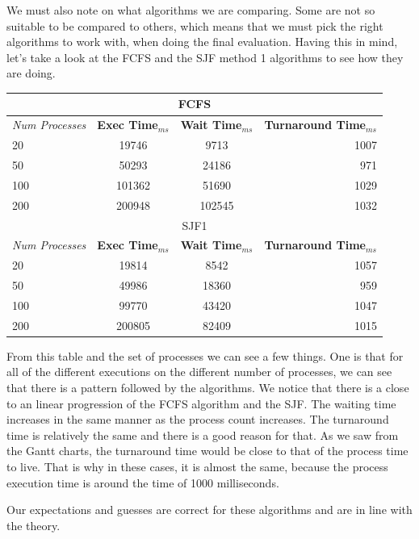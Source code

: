 \documentclass{article}
\begin{document}
We must also note on what algorithms we are comparing. Some are not so suitable to be compared to others, which means that we must pick the right algorithms to work with, when doing the final evaluation. Having this in mind, let's take a look at the FCFS and the SJF method 1 algorithms to see how they are doing.

\begin{center}
  \begin{tabular}{l|c|c|r}
    \multicolumn{4}{c}{FCFS} \\
    \toprule
    \textit{Num Processes} & \textbf{Exec Time}$_{ms}$ & \textbf{Wait Time}$_{ms}$ & \textbf{Turnaround Time}$_{ms}$ \\
    \midrule
    20 & 19746 & 9713 & 1007 \\ \hline
    50 & 50293 & 24186 & 971 \\ \hline
    100 & 101362 & 51690 & 1029 \\ \hline
    200 & 200948 & 102545 & 1032 \\
    \bottomrule
    \toprule
    \multicolumn{4}{c}{SJF1} \\
    \toprule
    \textit{Num Processes} & \textbf{Exec Time}$_{ms}$ & \textbf{Wait Time}$_{ms}$ & \textbf{Turnaround Time}$_{ms}$ \\
    \midrule
    20 & 19814 & 8542 & 1057 \\ \hline
    50 & 49986 & 18360 & 959 \\ \hline
    100 & 99770 & 43420 & 1047 \\ \hline
    200 & 200805 & 82409 & 1015 \\
    \bottomrule
    \toprule
  \end{tabular}
\end{center}

From this table and the set of processes we can see a few things. One is that for all of the different executions on the different number of processes, we can see that there is a pattern followed by the algorithms. We notice that there is a close to an linear progression of the FCFS algorithm and the SJF. The waiting time increases in the same manner as the process count increases. The turnaround time is relatively the same and there is a good reason for that. As we saw from the Gantt charts, the turnaround time would be close to that of the process time to live. That is why in these cases, it is almost the same, because the process execution time is around the time of 1000 milliseconds.

Our expectations and guesses are correct for these algorithms and are in line with the theory.
\end{document}
